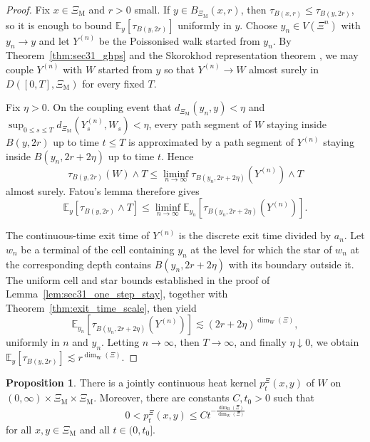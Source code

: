 \documentclass{article}
\theoremstyle{plain}
\theoremstyle{definition}
\newtheorem{proposition}[theorem]{Proposition}
\newcommand{\dimbox}{\dim_\mathrm{B}}
\newcommand{\dimwalk}{\dim_\mathrm{W}}
\begin{document}
\begin{proof}
Fix $x\in \Xi_{\mathrm M}$ and $r>0$ small.
If $y\in B_{\Xi_{\mathrm M}}(x,r)$, then $\tau_{B(x,r)}\le \tau_{B(y,2r)}$, so it is enough to bound $\mathbb E_y[\tau_{B(y,2r)}]$ uniformly in $y$.
Choose $y_n\in V(\Xi^n)$ with $y_n\to y$ and let $Y^{(n)}$ be the Poissonised walk started from $y_n$.
By Theorem~\ref{thm:sec31_ghps} and the Skorokhod representation theorem \cite{billingsley1999convergence}, we may couple $Y^{(n)}$ with $W$ started from $y$ so that $Y^{(n)}\to W$ almost surely in $D([0,T],\Xi_{\mathrm M})$ for every fixed $T$.

Fix $\eta>0$.
On the coupling event that $d_{\Xi_{\mathrm M}}(y_n,y)<\eta$ and $\sup_{0\le s\le T}d_{\Xi_{\mathrm M}}(Y_s^{(n)},W_s)<\eta$, every path segment of $W$ staying inside $B(y,2r)$ up to time $t\le T$ is approximated by a path segment of $Y^{(n)}$ staying inside $B(y_n,2r+2\eta)$ up to time $t$.
Hence
\[
\tau_{B(y,2r)}(W)\wedge T
\le
\liminf_{n\to\infty}\tau_{B(y_n,2r+2\eta)}(Y^{(n)})\wedge T
\]
almost surely.
Fatou's lemma therefore gives
\[
\mathbb E_y[\tau_{B(y,2r)}\wedge T]
\le
\liminf_{n\to\infty}
\mathbb E_{y_n}[\tau_{B(y_n,2r+2\eta)}(Y^{(n)})].
\]

The continuous-time exit time of $Y^{(n)}$ is the discrete exit time divided by $a_n$.
Let $w_n$ be a terminal of the cell containing $y_n$ at the level for which the star of $w_n$ at the corresponding depth contains $B(y_n,2r+2\eta)$ with its boundary outside it.
The uniform cell and star bounds established in the proof of Lemma~\ref{lem:sec31_one_step_stay}, together with Theorem~\ref{thm:exit_time_scale}, then yield
\[
\mathbb E_{y_n}[\tau_{B(y_n,2r+2\eta)}(Y^{(n)})]
\lesssim
(2r+2\eta)^{\dimwalk(\Xi)},
\]
uniformly in $n$ and $y_n$.
Letting $n\to\infty$, then $T\to\infty$, and finally $\eta\downarrow 0$, we obtain $\mathbb E_y[\tau_{B(y,2r)}]\lesssim r^{\dimwalk(\Xi)}$.
\end{proof}

\begin{proposition}\label{prop:heat-kernel}
There is a jointly continuous heat kernel $p_t^\Xi(x,y)$ of $W$ on $(0,\infty)\times \Xi_{\mathrm M}\times \Xi_{\mathrm M}$.
Moreover, there are constants $C,t_0>0$ such that
\[
0<p_t^\Xi(x,y)\le C t^{-\frac{\dimbox(\Xi)}{\dimwalk(\Xi)}}
\]
for all $x,y\in \Xi_{\mathrm M}$ and all $t\in(0,t_0]$.
\end{proposition}
\end{document}
